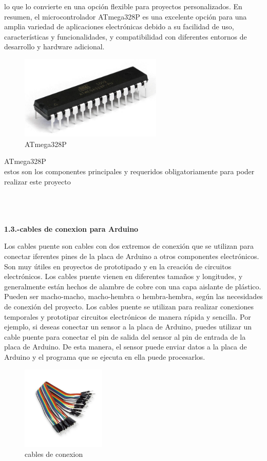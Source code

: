 \documentclass[11pt, letterpaper]{article}
\begin{document}
lo que lo convierte en una opción flexible para proyectos personalizados.
En resumen, el microcontrolador ATmega328P es una excelente opción para una amplia variedad de aplicaciones electrónicas 
debido a su facilidad de uso, características y funcionalidades, y compatibilidad con diferentes entornos de desarrollo y hardware adicional.
\begin{figure}[h!]
    \centering
    \includegraphics[height=4cm]{atmega328p-pu.png}
    \caption{ATmega328P }
    \label{fig:ATmega328P }
\end{figure} 
ATmega328P\\
estos son los componentes principales y requeridos obligatoriamente 
para poder realizar este proyecto
\\ \\
\\ \\
\begin{center}

    \textbf{1.3.-cables de conexion para Arduino}
\end{center}
Los cables puente son cables con dos extremos de conexión que se utilizan para conectar 
iferentes pines de la placa de Arduino a otros componentes electrónicos. Son muy útiles en proyectos de prototipado y en la creación 
de circuitos electrónicos.
Los cables puente vienen en diferentes
tamaños y longitudes, y generalmente están hechos de alambre de cobre con una capa aislante de plástico. 
Pueden ser macho-macho, macho-hembra o hembra-hembra, según las necesidades de conexión del proyecto.
Los cables puente se utilizan para realizar conexiones temporales y prototipar circuitos electrónicos de manera rápida y sencilla. 
Por ejemplo, si deseas conectar un sensor a la placa de Arduino, puedes utilizar un cable puente para conectar el pin de salida del sensor 
al pin de entrada de la placa de Arduino. De esta manera, el sensor puede enviar datos a la placa de Arduino y el programa que se ejecuta
en ella puede procesarlos.
\begin{figure}[h!]
    \centering
    \includegraphics[height=4cm]{cables-arduino.jpg}
    \caption{cables de conexion}
    \label{fig:cables de conexion }
\end{figure}
\end{document}

